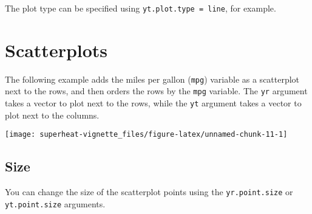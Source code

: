 \documentclass[]{book}
\newenvironment{Shaded}{\begin{snugshade}}{\end{snugshade}}
\newcommand{\KeywordTok}[1]{\textcolor[rgb]{0.13,0.29,0.53}{\textbf{{#1}}}}
\newcommand{\DataTypeTok}[1]{\textcolor[rgb]{0.13,0.29,0.53}{{#1}}}
\newcommand{\DecValTok}[1]{\textcolor[rgb]{0.00,0.00,0.81}{{#1}}}
\newcommand{\FloatTok}[1]{\textcolor[rgb]{0.00,0.00,0.81}{{#1}}}
\newcommand{\StringTok}[1]{\textcolor[rgb]{0.31,0.60,0.02}{{#1}}}
\newcommand{\CommentTok}[1]{\textcolor[rgb]{0.56,0.35,0.01}{\textit{{#1}}}}
\newcommand{\NormalTok}[1]{{#1}}
\theoremstyle{definition}
\theoremstyle{definition}
\theoremstyle{remark}
\begin{document}
The plot type can be specified using
\texttt{yt.plot.type\ =\ \textquotesingle{}line\textquotesingle{}}, for
example.

\hypertarget{scatterplot}{\section{Scatterplots}\label{scatterplot}}

The following example adds the miles per gallon (\texttt{mpg}) variable
as a scatterplot next to the rows, and then orders the rows by the
\texttt{mpg} variable. The \texttt{yr} argument takes a vector to plot
next to the rows, while the \texttt{yt} argument takes a vector to plot
next to the columns.

\begin{Shaded}
\end{Shaded}

\begin{center}\texttt{[image: superheat-vignette\_files/figure-latex/unnamed-chunk-11-1]} \end{center}

\subsection{Size}\label{size}

You can change the size of the scatterplot points using the
\texttt{yr.point.size} or \texttt{yt.point.size} arguments.

\begin{Shaded}
\end{Shaded}
\end{document}
